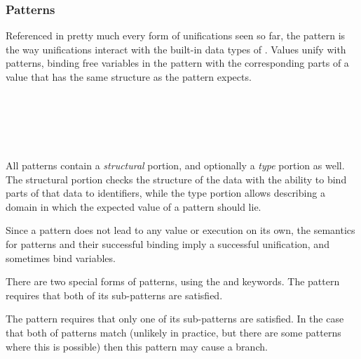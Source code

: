 \subsubsection{Patterns}

Referenced in pretty much every form of unifications seen so far, the pattern is
the way unifications interact with the built-in data types of \Trilogy{}. Values
unify with patterns, binding free variables in the pattern with the corresponding
parts of a value that has the same structure as the pattern expects.

\begin{bnf*}
     \\
     \\
     \\
     \\
\end{bnf*}

All patterns contain a \emph{structural} portion, and optionally a \emph{type}
portion as well. The structural portion checks the structure of the data with
the ability to bind parts of that data to identifiers, while the type portion
allows describing a domain in which the expected value of a pattern should lie.

Since a pattern does not lead to any value or execution on its own, the semantics for
patterns and their successful binding imply a successful unification, and sometimes
bind variables.

There are two special forms of patterns, using the  and  keywords.
The  pattern requires that both of its sub-patterns are satisfied.

\begin{prooftree}
\end{prooftree}

The  pattern requires that only one of its sub-patterns are satisfied.
In the case that both of patterns match (unlikely in practice, but there are
some patterns where this is possible) then this pattern may cause a branch.

